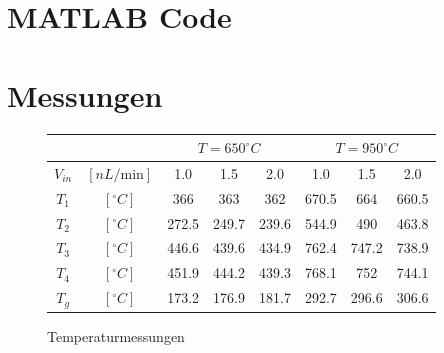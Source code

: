 \chapter{MATLAB Code}\label{c:datasheets}





%
%
%

%
%
%

\chapter{Messungen}

\begin{figure}[H]
\begin{tabular}{c|c||c|c|c|c|c|c|}
\cline{3-8}

\multicolumn{2}{c|}{} & \multicolumn{3}{c|}{$T = 650 ^\circ C$} & \multicolumn{3}{c|}{$T = 950 ^\circ C$} \\ \hline
\multicolumn{1}{|c|}{ $V_{in} $ }& $[nL/\text{min}]$ &1.0 & 1.5 & 2.0 & 1.0 & 1.5 & 2.0\\
\hline
\multicolumn{1}{|c|}{   $T_1$ }& $[^\circ C]$   & 366               & 363                 & 362               & 670.5             & 664                 & 660.5             \\ \hline
\multicolumn{1}{|c|}{        $T_2$ }& $[^\circ C]$   & 272.5             & 249.7               & 239.6             & 544.9             & 490                 & 463.8             \\ \hline
\multicolumn{1}{|c|}{        $T_3$ }& $[^\circ C]$   & 446.6                 & 439.6                   & 434.9                 & 762.4                 & 747.2                   & 738.9                 \\ \hline
\multicolumn{1}{|c|}{        $T_4$ }& $[^\circ C]$   & 451.9          & 444.2                   & 439.3                & 768.1                & 752                   & 744.1                 \\ \hline
\multicolumn{1}{|c|}{        $T_g$ }& $ [^\circ C]$   & 173.2             & 176.9               & 181.7             & 292.7             & 296.6               & 306.6             \\ 
\hline





\end{tabular}
\caption{Temperaturmessungen}
\label{tab:t1}
\end{figure}